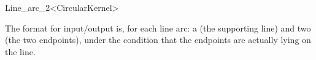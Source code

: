 \begin{ccRefClass}{Line_arc_2<CircularKernel>}
\ccGlue
{}

The format for input/output is, for each line arc: a  
(the supporting line) and two  (the two endpoints), 
under the condition that the endpoints are actually lying on the line. 

\ccSeeAlso

\\

\end{ccRefClass}

